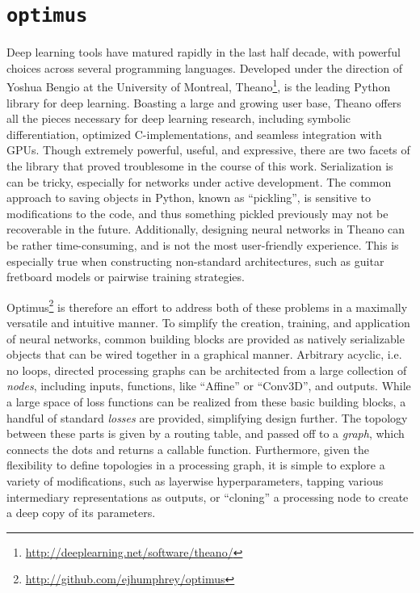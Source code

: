 \section{\texttt{optimus}}
\label{sec:optimus}

Deep learning tools have matured rapidly in the last half decade, with powerful choices across several programming languages.
Developed under the direction of Yoshua Bengio at the University of Montreal, Theano\footnote{\url{http://deeplearning.net/software/theano/}}, is the leading Python library for deep learning.
Boasting a large and growing user base, Theano offers all the pieces necessary for deep learning research, including symbolic differentiation, optimized C-implementations, and seamless integration with GPUs.
Though extremely powerful, useful, and expressive, there are two facets of the library that proved troublesome in the course of this work.
Serialization is can be tricky, especially for networks under active development.
The common approach to saving objects in Python, known as ``pickling'', is sensitive to modifications to the code, and thus something pickled previously may not be recoverable in the future.
Additionally, designing neural networks in Theano can be rather time-consuming, and is not the most user-friendly experience.
This is especially true when constructing non-standard architectures, such as guitar fretboard models or pairwise training strategies.

Optimus\footnote{\url{http://github.com/ejhumphrey/optimus}} is therefore an effort to address both of these problems in a maximally versatile and intuitive manner.
To simplify the creation, training, and application of neural networks, common building blocks are provided as natively serializable objects that can be wired together in a graphical manner.
Arbitrary acyclic, i.e. no loops, directed processing graphs can be architected from a large collection of \emph{nodes}, including inputs, functions, like ``Affine'' or ``Conv3D'', and outputs.
While a large space of loss functions can be realized from these basic building blocks, a handful of standard \emph{losses} are provided, simplifying design further.
The topology between these parts is given by a routing table, and passed off to a \emph{graph}, which connects the dots and returns a callable function.
Furthermore, given the flexibility to define topologies in a processing graph, it is simple to explore a variety of modifications, such as layerwise hyperparameters, tapping various intermediary representations as outputs, or ``cloning'' a processing node to create a deep copy of its parameters.

